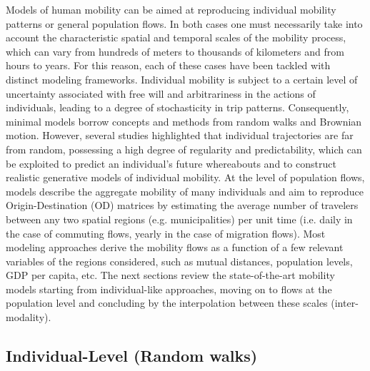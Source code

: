 Models of human mobility can be aimed at reproducing individual mobility patterns or general population flows. 
In both cases one must necessarily take into account the characteristic spatial and temporal scales of the mobility process, which can vary from hundreds of meters to thousands of kilometers and from hours to years.
For this reason, each of these cases have been tackled with distinct modeling frameworks. 
Individual mobility is subject to a certain level of uncertainty associated with free will and arbitrariness in the actions of individuals, leading to a degree of stochasticity in trip patterns. Consequently, minimal models borrow concepts and methods from random walks and Brownian motion. 
However, several studies highlighted that individual trajectories are far from random, possessing a high degree of regularity and predictability, which can be exploited to predict an individual's future whereabouts and to construct realistic generative models of individual mobility. 
At the level of population flows, models describe the aggregate mobility of many individuals and aim to reproduce Origin-Destination (OD) matrices by estimating the average number of travelers between any two spatial regions (e.g. municipalities) per unit time (i.e. daily in the case of commuting flows, yearly in the case of migration flows).
Most modeling approaches derive the mobility flows as a function of a few relevant variables of the regions considered, such as mutual distances, population levels, GDP per capita, etc. 
The next sections review the state-of-the-art mobility models starting from individual-like approaches, moving on to flows at the population level and concluding by the interpolation between these scales  (inter-modality).

\subsection{Individual-Level (Random walks)}
\label{sec:rw}

